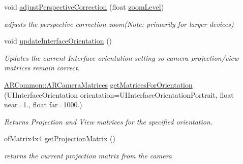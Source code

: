 \begin{DoxyCompactItemize}
\mbox{\label{class_a_r_core_1_1_a_r_cam_ae2ecd3007e6684d1686c89d2ac3e7020}} 
void \hyperlink{class_a_r_core_1_1_a_r_cam_ae2ecd3007e6684d1686c89d2ac3e7020}{adjust\+Perspective\+Correction} (float \hyperlink{class_a_r_core_1_1_a_r_cam_ac17d3b7fd12f51b2c54b7241efd36cd4}{zoom\+Level})
\begin{DoxyCompactList}\small\item\em adjusts the perspective correction zoom(\+Note\+: primarily for larger devices) \end{DoxyCompactList}\item 
\mbox{\label{class_a_r_core_1_1_a_r_cam_ac649b1e884931f123afd4dcecc1e3e6c}} 
void \hyperlink{class_a_r_core_1_1_a_r_cam_ac649b1e884931f123afd4dcecc1e3e6c}{update\+Interface\+Orientation} ()
\begin{DoxyCompactList}\small\item\em Updates the current Interface orientation setting so camera projection/view matrices remain correct. \end{DoxyCompactList}\item 
\mbox{\label{class_a_r_core_1_1_a_r_cam_a0061e3c56e3d30e6fec64235d9397809}} 
\hyperlink{struct_a_r_common_1_1_a_r_camera_matrices}{A\+R\+Common\+::\+A\+R\+Camera\+Matrices} \hyperlink{class_a_r_core_1_1_a_r_cam_a0061e3c56e3d30e6fec64235d9397809}{get\+Matrices\+For\+Orientation} (U\+I\+Interface\+Orientation orientation=U\+I\+Interface\+Orientation\+Portrait, float near=1., float far=1000.)
\begin{DoxyCompactList}\small\item\em Returns Projection and View matrices for the specified orientation. \end{DoxyCompactList}\item 
\mbox{\label{class_a_r_core_1_1_a_r_cam_a19409c89b0bcbaad62e5d405d194f8a7}} 
of\+Matrix4x4 \hyperlink{class_a_r_core_1_1_a_r_cam_a19409c89b0bcbaad62e5d405d194f8a7}{get\+Projection\+Matrix} ()
\begin{DoxyCompactList}\small\item\em returns the current projection matrix from the camera \end{DoxyCompactList}\item 
\mbox{\label{class_a_r_core_1_1_a_r_cam_a7ca28300844875464c7821620665d3b5}} 

\end{DoxyCompactItemize}
